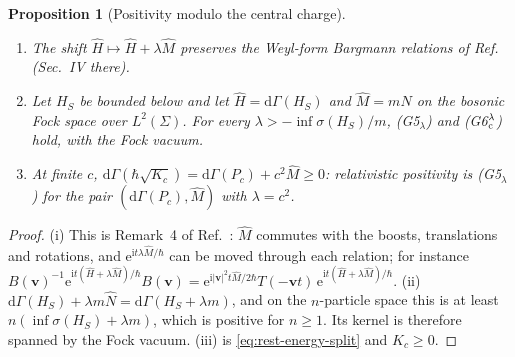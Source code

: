 \documentclass[%
 aip,
 jmp,
 amsmath,amssymb,
 reprint, onecolumn
]{revtex4-1}
\newtheorem{proposition}{Proposition}
\theoremstyle{definition}
\theoremstyle{remark}
\newcommand{\rmd}{\mathrm{d}}
\newcommand{\rmi}{\mathrm{i}}
\newcommand{\rme}{\mathrm{e}}
\newcommand{\bv}{\mathbf{v}}
\begin{document}
\begin{proposition}[Positivity modulo the central charge]
\label{prop:positivity}
\begin{enumerate}[label=(\roman*)]
\item The shift $\hat H\mapsto\hat H+\lambda\hat M$ preserves the
Weyl-form Bargmann relations of
Ref.~
(Sec.~IV there).
\item Let $H_S$ be bounded below and let $\hat H=\rmd\Gamma(H_S)$ and
$\hat M=m\hat N$ on the bosonic Fock space over $L^2(\Sigma)$. For every
$\lambda>-\inf\sigma(H_S)/m$, (G5$_\lambda$) and (G6$_{\rm c}^\lambda$)
hold, with the Fock vacuum.
\item At finite $c$, $\rmd\Gamma(\hbar\sqrt{K_c})=\rmd\Gamma(P_c)+c^2
\hat M\geq0$: relativistic positivity is (G5$_\lambda$) for the
pair $(\rmd\Gamma(P_c),\hat M)$ with $\lambda=c^2$.
\end{enumerate}
\end{proposition}

\begin{proof}
(i) This is Remark~4 of
Ref.~:
$\hat M$ commutes with the boosts, translations and rotations, and
$\rme^{\rmi t\lambda\hat M/\hbar}$ can be moved through each relation;
for instance $B(\bv)^{-1}\rme^{\rmi t(\hat H+\lambda\hat M)/\hbar}B(\bv)=
\rme^{\rmi|\bv|^2t\hat M/2\hbar}T(-\bv t)\,\rme^{\rmi t(\hat H+\lambda
\hat M)/\hbar}$. (ii) $\rmd\Gamma(H_S)+\lambda m\hat N=\rmd\Gamma(H_S+
\lambda m)$, and on the $n$-particle space this is at least
$n(\inf\sigma(H_S)+\lambda m)$, which is positive for $n\geq1$. Its
kernel is therefore spanned by the Fock vacuum. (iii) is
\eqref{eq:rest-energy-split} and $K_c\geq0$.
\end{proof}
\end{document}
